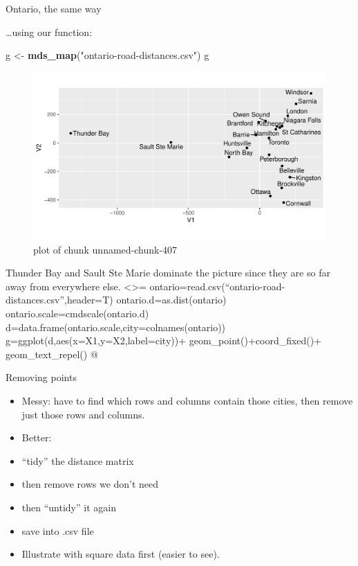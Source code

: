 \documentclass[ignorenonframetext,]{beamer}
\newenvironment{Shaded}{\begin{snugshade}}{\end{snugshade}}
\newcommand{\KeywordTok}[1]{\textcolor[rgb]{0.13,0.29,0.53}{\textbf{#1}}}
\newcommand{\NormalTok}[1]{#1}
\newcommand{\StringTok}[1]{\textcolor[rgb]{0.31,0.60,0.02}{#1}}
\begin{document}
\begin{frame}[fragile]{Ontario, the same way}
\protect\hypertarget{ontario-the-same-way}{}

\ldots using our function:

\begin{Shaded}
\begin{Highlighting}[]
\NormalTok{g <-}\StringTok{ }\KeywordTok{mds_map}\NormalTok{(}\StringTok{"ontario-road-distances.csv"}\NormalTok{)}
\NormalTok{g}
\end{Highlighting}
\end{Shaded}

\begin{figure}
\centering
\includegraphics{figure/unnamed-chunk-407-1.pdf}
\caption{plot of chunk unnamed-chunk-407}
\end{figure}

Thunder Bay and Sault Ste Marie dominate the picture since they are so
far away from everywhere else. \textless{}\textgreater{}=
ontario=read.csv(``ontario-road-distances.csv'',header=T)
ontario.d=as.dist(ontario) ontario.scale=cmdscale(ontario.d)
d=data.frame(ontario.scale,city=colnames(ontario))
g=ggplot(d,aes(x=X1,y=X2,label=city))+ geom\_point()+coord\_fixed()+
geom\_text\_repel() @

\end{frame}

\begin{frame}{Removing points}
\protect\hypertarget{removing-points}{}

\begin{itemize}
\item
  Messy: have to find which rows and columns contain those cities, then
  remove just those rows and columns.
\item
  Better:
\item
  ``tidy'' the distance matrix
\item
  then remove rows we don't need
\item
  then ``untidy'' it again
\item
  save into .csv file
\item
  Illustrate with square data first (easier to see).
\end{itemize}

\end{frame}
\end{document}
